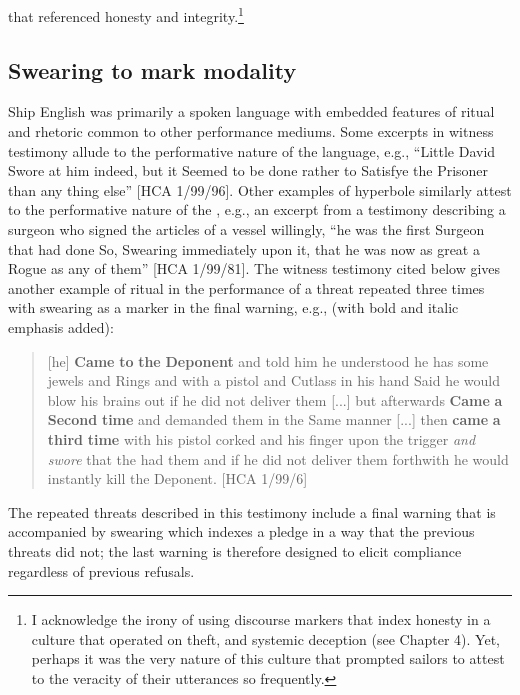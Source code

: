 that referenced honesty and integrity.\footnote{I acknowledge the irony of using discourse markers that index honesty in a culture that operated on theft,  and systemic deception (see Chapter 4). Yet, perhaps it was the very nature of this culture that prompted sailors to attest to the veracity of their utterances so frequently.} 

\subsection{{Swearing to mark modality}}%

Ship English was primarily a spoken language with embedded features of ritual and rhetoric common to other performance mediums. Some excerpts in witness testimony allude to the performative nature of the language, e.g., “Little David Swore at him indeed, but it Seemed to be done rather to Satisfye the Prisoner than any thing else” [HCA 1/99/96]. Other examples of hyperbole similarly attest to the performative nature of the , e.g., an excerpt from a testimony describing a surgeon who signed the articles of a  vessel willingly, “he was the first Surgeon that had done So, Swearing immediately upon it, that he was now as great a Rogue as any of them” [HCA 1/99/81]. The witness testimony cited below gives another example of ritual in the performance of a threat repeated three times with swearing as a marker in the final warning, e.g., (with bold and italic emphasis added):

\begin{quotation}
[he] \textbf{Came} \textbf{to} \textbf{the} \textbf{Deponent} and told him he understood he has some jewels and Rings and with a pistol and Cutlass in his hand Said he would blow his brains out if he did not deliver them [...] but afterwards \textbf{Came} \textbf{a} \textbf{Second} \textbf{time} and demanded them in the Same manner [...] then \textbf{came} \textbf{a} \textbf{third} \textbf{time} with his pistol corked and his finger upon the trigger \textit{and swore} that the  had them and if he did not deliver them forthwith he would instantly kill the Deponent. [HCA 1/99/6]
\end{quotation}

The repeated threats described in this testimony include a final warning that is accompanied by swearing which indexes a pledge in a way that the previous threats did not; the last warning is therefore designed to elicit compliance regardless of previous refusals. 


